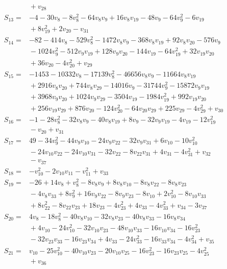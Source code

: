 \begin{align*}
&{}+v_{28}\\
S_{13}={}&-4-30v_{8}-8v_{8}^{2}-64v_{8}v_{9}+16v_{8}v_{19}-48v_{9}-64v_{9}^{2}-6v_{19}\\
&{}+8v_{19}^{2}+2v_{20}-v_{31}\\
S_{14}={}&-82-414v_{8}-529v_{8}^{2}-1472v_{8}v_{9}-368v_{8}v_{19}+92v_{8}v_{20}-576v_{9}\\
&{}-1024v_{9}^{2}-512v_{9}v_{19}+128v_{9}v_{20}-144v_{19}-64v_{19}^{2}+32v_{19}v_{20}\\
&{}+36v_{20}-4v_{20}^{2}+v_{29}\\
S_{15}={}&-1453-10332v_{8}-17139v_{8}^{2}-46656v_{8}v_{9}-11664v_{8}v_{19}\\
&{}+2916v_{8}v_{20}+744v_{8}v_{29}-14016v_{9}-31744v_{9}^{2}-15872v_{9}v_{19}\\
&{}+3968v_{9}v_{20}+1024v_{9}v_{29}-3504v_{19}-1984v_{19}^{2}+992v_{19}v_{20}\\
&{}+256v_{19}v_{29}+876v_{20}-124v_{20}^{2}-64v_{20}v_{29}+225v_{29}-4v_{29}^{2}+v_{30}\\
S_{16}={}&-1-28v_{8}^{2}-32v_{8}v_{9}-40v_{8}v_{19}+8v_{9}-32v_{9}v_{19}-4v_{19}-12v_{19}^{2}\\
&{}-v_{20}+v_{31}\\
S_{17}={}&49-34v_{9}^{2}-44v_{9}v_{10}-24v_{9}v_{22}-32v_{9}v_{31}+6v_{10}-10v_{10}^{2}\\
&{}-24v_{10}v_{22}-24v_{10}v_{31}-32v_{22}-8v_{22}v_{31}+4v_{31}-4v_{31}^{2}+v_{32}\\
&{}-v_{37}\\
S_{18}={}&-v_{10}^{2}-2v_{10}v_{11}-v_{11}^{2}+v_{33}\\
S_{19}={}&-26+14v_{8}+v_{8}^{2}-8v_{8}v_{9}+8v_{8}v_{10}-8v_{8}v_{22}-8v_{8}v_{23}\\
&{}-4v_{8}v_{33}+8v_{9}^{2}+16v_{9}v_{22}-8v_{9}v_{23}-8v_{10}+2v_{10}^{2}-8v_{10}v_{33}\\
&{}+8v_{22}^{2}-8v_{22}v_{23}+18v_{23}-4v_{23}^{2}+4v_{33}-4v_{33}^{2}+v_{34}-3v_{37}\\
S_{20}={}&4v_{8}-18v_{8}^{2}-40v_{8}v_{10}-32v_{8}v_{23}-40v_{8}v_{33}-16v_{8}v_{34}\\
&{}+4v_{10}-24v_{10}^{2}-32v_{10}v_{23}-48v_{10}v_{33}-16v_{10}v_{34}-16v_{23}^{2}\\
&{}-32v_{23}v_{33}-16v_{23}v_{34}+4v_{33}-24v_{33}^{2}-16v_{33}v_{34}-4v_{34}^{2}+v_{35}\\
S_{21}={}&v_{10}-25v_{10}^{2}-40v_{10}v_{23}-20v_{10}v_{25}-16v_{23}^{2}-16v_{23}v_{25}-4v_{25}^{2}\\
&{}+v_{36}\\

\end{align*}
